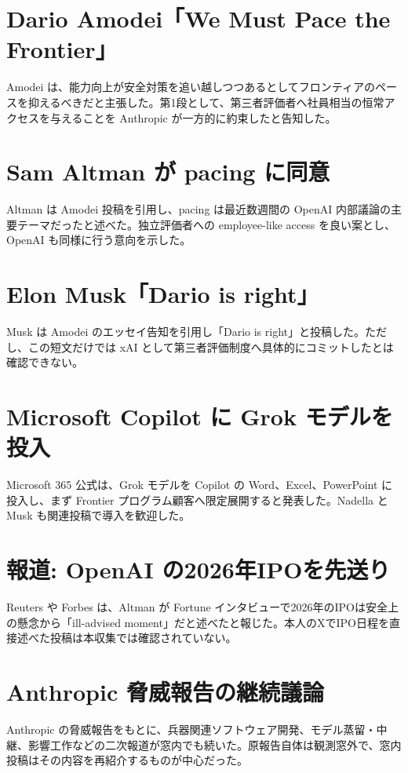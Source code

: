 \section{Dario Amodei「We Must Pace the Frontier」}
Amodei は、能力向上が安全対策を追い越しつつあるとしてフロンティアのペースを抑えるべきだと主張した。第1段として、第三者評価者へ社員相当の恒常アクセスを与えることを Anthropic が一方的に約束したと告知した。

\section{Sam Altman が pacing に同意}
Altman は Amodei 投稿を引用し、pacing は最近数週間の OpenAI 内部議論の主要テーマだったと述べた。独立評価者への employee-like access を良い案とし、OpenAI も同様に行う意向を示した。

\section{Elon Musk「Dario is right」}
Musk は Amodei のエッセイ告知を引用し「Dario is right」と投稿した。ただし、この短文だけでは xAI として第三者評価制度へ具体的にコミットしたとは確認できない。

\section{Microsoft Copilot に Grok モデルを投入}
Microsoft 365 公式は、Grok モデルを Copilot の Word、Excel、PowerPoint に投入し、まず Frontier プログラム顧客へ限定展開すると発表した。Nadella と Musk も関連投稿で導入を歓迎した。

\section{報道: OpenAI の2026年IPOを先送り}
Reuters や Forbes は、Altman が Fortune インタビューで2026年のIPOは安全上の懸念から「ill-advised moment」だと述べたと報じた。本人のXでIPO日程を直接述べた投稿は本収集では確認されていない。

\section{Anthropic 脅威報告の継続議論}
Anthropic の脅威報告をもとに、兵器関連ソフトウェア開発、モデル蒸留・中継、影響工作などの二次報道が窓内でも続いた。原報告自体は観測窓外で、窓内投稿はその内容を再紹介するものが中心だった。

